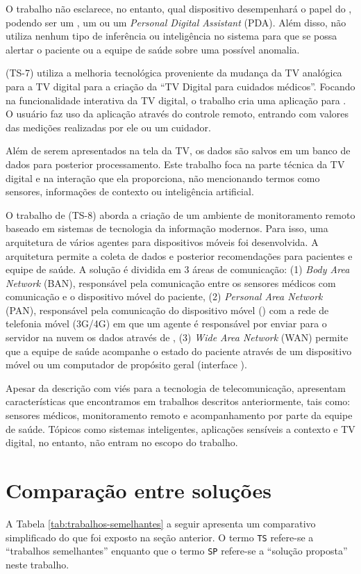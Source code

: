 O trabalho não esclarece, no entanto, qual dispositivo desempenhará o papel do
\gateway[], podendo ser um \tablet[], um \smartphone[] ou um \textit{Personal
Digital Assistant} (PDA). Além disso, não utiliza nenhum tipo de inferência ou
inteligência no sistema para que se possa alertar o paciente ou a equipe de
saúde sobre uma possível anomalia.

 (TS-7) utiliza a melhoria tecnológica proveniente da
mudança da TV analógica para a TV digital para a criação da ``TV Digital para
cuidados médicos''. Focando na funcionalidade interativa da TV digital,
o trabalho cria uma aplicação para \stb[]. O usuário faz uso da aplicação através
do controle remoto, entrando com valores das medições realizadas por ele ou um
cuidador. 

Além de serem apresentados na tela da TV, os dados são salvos
em um banco de dados para posterior processamento. Este trabalho foca na parte
técnica da TV digital e na interação que ela proporciona, não
mencionando termos como sensores, informações de contexto ou inteligência
artificial.

O trabalho de  (TS-8) aborda a criação de um ambiente de
monitoramento remoto baseado em sistemas de tecnologia da informação modernos.
Para isso, uma arquitetura de vários agentes para dispositivos móveis foi
desenvolvida. A arquitetura permite a coleta de dados e posterior recomendações
para pacientes e equipe de saúde. A solução é dividida em 3 áreas de
comunicação: (1) \textit{Body Area Network} (BAN), responsável pela comunicação
entre os sensores médicos com comunicação \bluetooth[] e o dispositivo móvel do
paciente,  (2) \textit{Personal Area Network} (PAN), responsável pela
comunicação do dispositivo móvel (\smartphone) com a rede de telefonia móvel
(3G/4G) em que um agente é responsável por enviar para o servidor na nuvem os dados
através de \webservices[],  (3) \textit{Wide Area Network} (WAN) permite que a equipe
de saúde acompanhe o estado do paciente através de um dispositivo móvel ou um
computador de propósito geral (interface \web).

Apesar da descrição com viés para a tecnologia de telecomunicação,
 apresentam características que encontramos em
trabalhos descritos anteriormente, tais como: sensores médicos, monitoramento
remoto e acompanhamento por parte da equipe de saúde. Tópicos como sistemas
inteligentes, aplicações sensíveis a contexto e TV digital, no entanto, não
entram no escopo do trabalho.

\section{Comparação entre soluções} \label{sec:comparacao}

A Tabela \ref{tab:trabalhos-semelhantes} a seguir apresenta um comparativo
simplificado do que foi exposto na seção anterior. O termo \texttt{TS} refere-se
a ``trabalhos semelhantes'' enquanto que o termo \texttt{SP} refere-se a
``solução proposta'' neste trabalho.


